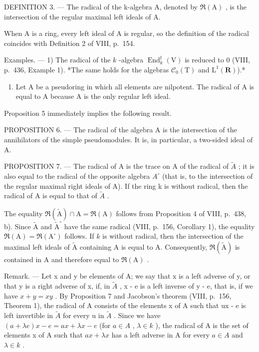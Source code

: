 DEFINITION 3. --- The radical of the k-algebra A, denoted by \(\Re(\mathrm{A})\) , is the intersection of the regular maximal left ideals of A.

When A is a ring, every left ideal of A is regular, so the definition of the radical coincides with Definition 2 of VIII, p.~154.

Examples. --- 1) The radical of the \(k\) -algebra \(\operatorname{End}_k^{\mathrm{f}}(\mathrm{V})\) is reduced to 0 (VIII, p.~436, Example 1). *The same holds for the algebras \(\mathcal{C}_0(\mathrm{T})\) and \(\mathrm{L}^1 (\mathbf{R})\)).*

\begin{enumerate}
\def\labelenumi{\arabic{enumi})}
\setcounter{enumi}{1}
\tightlist
\item
  Let A be a pseudoring in which all elements are nilpotent. The radical of A is equal to A because A is the only regular left ideal.
\end{enumerate}

Proposition 5 immediately implies the following result.

PROPOSITION 6. --- The radical of the algebra A is the intersection of the annihilators of the simple pseudomodules. It is, in particular, a two-sided ideal of A.

PROPOSITION 7. --- The radical of A is the trace on A of the radical of \(\widetilde{A}\) ; it is also equal to the radical of the opposite algebra \(A^{\circ}\) (that is, to the intersection of the regular maximal right ideals of A). If the ring k is without radical, then the radical of A is equal to that of \(\widetilde{A}\) .

The equality \(\Re (\widetilde{\mathrm{A}})\cap \mathrm{A} = \Re (\mathrm{A})\) follows from Proposition 4 of VIII, p.~438, b). Since \(\widetilde{\mathrm{A}}\) and \(\widetilde{\mathrm{A}}^{\circ}\) have the same radical (VIII, p.~156, Corollary 1), the equality \(\Re (\mathrm{A}) = \Re (\mathrm{A}^{\circ})\) follows. If \(k\) is without radical, then the intersection of the maximal left ideals of \(\widetilde{\mathrm{A}}\) containing A is equal to A. Consequently, \(\Re (\widetilde{\mathrm{A}})\) is contained in A and therefore equal to \(\Re (\mathrm{A})\) .

Remark. --- Let x and y be elements of A; we say that x is a left adverse of y, or that y is a right adverse of x, if, in \(\widetilde{A}\) , x - e is a left inverse of y - e, that is, if we have \(x + y = xy\) . By Proposition 7 and Jacobson's theorem (VIII, p.~156, Theorem 1), the radical of A consists of the elements x of A such that ux - e is left invertible in \(\widetilde{A}\) for every u in \(\widetilde{A}\) . Since we have \((a + \lambda e)x - e = ax + \lambda x - e\) (for \(a \in A\) , \(\lambda \in k\) ), the radical of A is the set of elements x of A such that \(ax + \lambda x\) has a left adverse in A for every \(a \in A\) and \(\lambda \in k\) .

